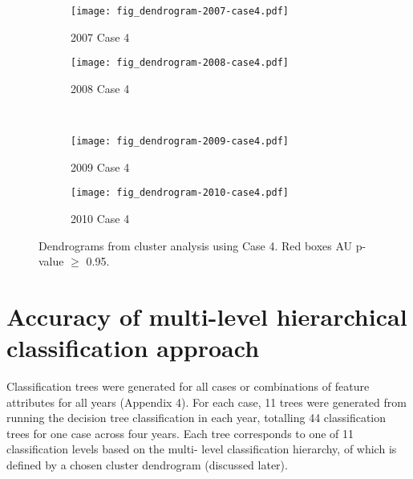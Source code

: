\begin{figure}[!ht] \centering
	\captionsetup[subfigure]{width=2.0in} %
	\begin{subfigure}[t]{0.49\textwidth}
		\texttt{[image: fig\_dendrogram-2007-case4.pdf]}
		\caption[Case 4 cluster dendrograms.]{2007 Case 4}
		\label{fig: result-fig4.11a}
	\end{subfigure}
	\begin{subfigure}[t]{0.49\textwidth}
		\texttt{[image: fig\_dendrogram-2008-case4.pdf]}
		\caption[Case 4 cluster dendrograms.]{2008 Case 4}
		\label{fig: result-fig4.11b}
	\end{subfigure}\\
	\vspace{15pt}
	\begin{subfigure}[t]{0.49\textwidth}
		\texttt{[image: fig\_dendrogram-2009-case4.pdf]}
		\caption[Case 4 cluster dendrograms.]{2009 Case 4}
		\label{fig: result-fig4.11c}
	\end{subfigure}
	\begin{subfigure}[t]{0.49\textwidth}
		\texttt{[image: fig\_dendrogram-2010-case4.pdf]}
		\caption[Case 4 cluster dendrograms.]{2010 Case 4}
		\label{fig: result-fig4.11d}
	\end{subfigure}
	\vspace{5pt}
	\caption[Dendrograms from cluster analysis using Case 4.]{Dendrograms from cluster analysis using Case 4. Red boxes AU p-value $\geq$ 0.95.}
	\label{fig: result-fig4.11}
\end{figure}

\section{Accuracy of multi-level hierarchical classification approach}
\label{sec: result-accuracy-hierarchical}

Classification trees were generated for all cases or combinations of feature attributes for all years (Appendix 4). For each case, 11 trees were generated from running the decision tree classification in each year, totalling 44 classification trees for one case across four years. Each tree corresponds to one of 11 classification levels based on the multi- level classification hierarchy, of which is defined by a chosen cluster dendrogram (discussed later).

